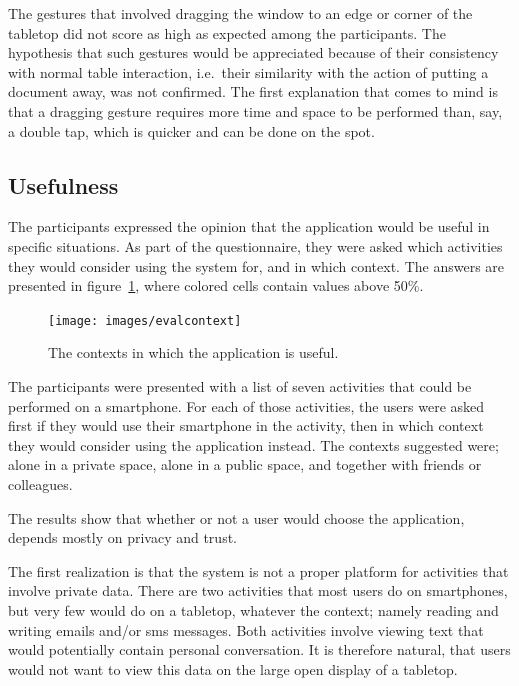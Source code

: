 The gestures that involved dragging the window to an edge or corner of the tabletop did not score as high as expected among the participants.
The hypothesis that such gestures would be appreciated because of their consistency with normal table interaction, i.e.\ their similarity with the action of putting a document away, was not confirmed.
The first explanation that comes to mind is that a dragging gesture requires more time and space to be performed than, say, a double tap, which is quicker and can be done on the spot.


\subsection{Usefulness}

The participants expressed the opinion that the application would be useful in specific situations.
As part of the questionnaire, they were asked which activities they would consider using the system for, and in which context.
The answers are presented in figure~\ref{fig:evalcontext}, where colored cells contain values above 50\%.

\begin{figure}[htb]
  \centering
    \texttt{[image: images/evalcontext]}
    \caption{The contexts in which the application is useful.}
    \label{fig:evalcontext}
\end{figure}

The participants were presented with a list of seven activities that could be performed on a smartphone.
For each of those activities, the users were asked first if they would use their smartphone in the activity, then in which context they would consider using the application instead.
The contexts suggested were; alone in a private space, alone in a public space, and together with friends or colleagues.

The results show that whether or not a user would choose the application, depends mostly on privacy and trust.

The first realization is that the system is not a proper platform for activities that involve private data.
There are two activities that most users do on smartphones, but very few would do on a tabletop, whatever the context; namely reading and writing emails and/or sms messages.
Both activities involve viewing text that would potentially contain personal conversation.
It is therefore natural, that users would not want to view this data on the large open display of a tabletop.

